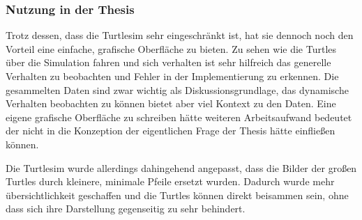 \subsubsection*{Nutzung in der Thesis}
Trotz dessen, dass die Turtlesim sehr eingeschränkt ist, hat sie dennoch noch den Vorteil eine einfache, grafische Oberfläche zu bieten. Zu sehen wie die Turtles über die Simulation fahren und sich verhalten ist sehr hilfreich das generelle Verhalten zu beobachten und Fehler in der Implementierung zu erkennen. Die gesammelten Daten sind zwar wichtig als Diskussionsgrundlage, das dynamische Verhalten beobachten zu können bietet aber viel Kontext zu den Daten.
Eine eigene grafische Oberfläche zu schreiben hätte weiteren Arbeitsaufwand bedeutet der nicht in die Konzeption der eigentlichen Frage der Thesis hätte einfließen können.

Die Turtlesim wurde allerdings dahingehend angepasst, dass die Bilder der großen Turtles durch kleinere, minimale Pfeile ersetzt wurden. Dadurch wurde mehr übersichtlichkeit geschaffen und die Turtles können direkt beisammen sein, ohne dass sich ihre Darstellung gegenseitig zu sehr behindert.
